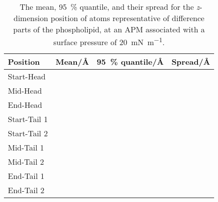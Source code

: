 \begin{table}
\centering
\small
  \caption{\ The mean, \SI{95}{\percent} quantile, and their spread for the \emph{z}-dimension position of atoms representative of difference parts of the phospholipid, at an APM associated with a surface pressure of \SI{20}{\milli\newton\per\meter}.}
  \label{tab:spread2}
  \begin{tabular}{llll}
    \toprule
    Position & Mean/\si{\angstrom} & \SI{95}{\percent} quantile/\si{\angstrom} & Spread/\si{\angstrom} \\
    \midrule
    Start-Head &  &  &  \\
    Mid-Head &  &  &  \\
    End-Head &  &  &  \\
    \midrule
    Start-Tail 1 &  &  &  \\
    Start-Tail 2 &  &  &  \\
    Mid-Tail 1 &  &  &  \\
    Mid-Tail 2 &  &  &  \\
    End-Tail 1 &  &  &  \\
    End-Tail 2 &  &  &  \\
    \bottomrule
  \end{tabular}
\end{table}

